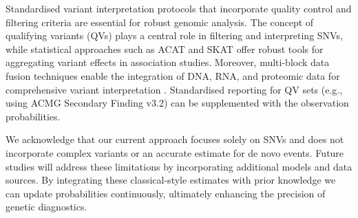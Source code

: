 Standardised variant interpretation protocols that incorporate quality control and filtering criteria \citep{pedersen2021effective,anderson2010data} are essential for robust genomic analysis. 
The concept of qualifying variants (QVs) \citep{cirulli2015exome,tavtigian2020fitting} plays a central role in filtering and interpreting SNVs, while statistical approaches such as ACAT and SKAT \citep{liu2019acat,li2020dynamic,wu2011rare,lee2012optimal} offer robust tools for aggregating variant effects in association studies. Moreover, multi-block data fusion techniques enable the integration of DNA, RNA, and proteomic data for comprehensive variant interpretation \citep{kong2018nature,howe2021within}. Standardised reporting for QV sets (e.g., using ACMG Secondary Finding v3.2) \citep{miller2023acmg} can be supplemented with the observation probabilities.

We acknowledge that our current approach focuses solely on SNVs and does not incorporate complex variants or an accurate estimate for de novo events. Future studies will address these limitations by incorporating additional models and data sources. By integrating these classical-style estimates with prior knowledge we can update probabilities continuously, ultimately enhancing the precision of genetic diagnostics.

\newpage




